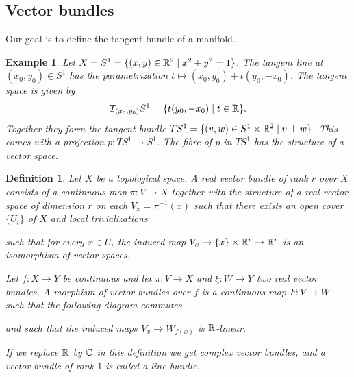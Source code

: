 \documentclass[A4paper, british]{amsart}
\theoremstyle{darkgreentheorem}
\theoremstyle{darkbluedefinition}
\newtheorem{defn}[thm]{Definition}
\theoremstyle{darkredexample}
\newtheorem{exa}[thm]{Example}
\theoremstyle{remark}
\newcommand{\1}{\mathbbm{1}}
\begin{document}
\subsection{Vector bundles}

Our goal is to define the tangent bundle of a manifold.

\begin{exa}
    Let $X=S^{1}=\{(x,y)\in \mathbb{R}^{2}\mid x^{2}+y^{2}=1\}$.
    The tangent line at $(x_{0},y_{0})\in S^{1}$ has the parametrization $t\mapsto (x_{0},y_{0})+t(y_{0},-x_{0})$.
    The tangent space is given by
    \[ T_{(x_{0},y_{0})}S^{1}=\{ t(y_{0},-x_{0})\mid t\in \mathbb{R}\}.\]
    Together they form the tangent bundle $TS^{1}=\{(v,w)\in S^{1}\times \mathbb{R}^{2}\mid v\perp w\}$.
    This comes with a projection $p\colon TS^{1}\to S^{1}$.
    The fibre of $p$ in $TS^{1}$ has the structure of a vector space.
\end{exa}

\begin{defn}
    Let $X$ be a topological space.
    A \textit{real vector bundle} of rank $r$ over $X$ consists of a continuous map $\pi\colon V\to X$ together with the structure of a real vector space of dimension $r$ on each $V_{x}=\pi^{-1}(x)$ such that there exists an open cover $\{U_{i}\}$ of $X$ and local trivializations
    \begin{center}
    \end{center}
    such that for every $x\in U_{i}$ the induced map $V_{x}\to \{x\}\times \mathbb{R}^{r}\to \mathbb{R}^{r}$ is an isomorphism of vector spaces.

    Let $f\colon X\to Y$ be continuous and let $\pi\colon V\to X$ and $\xi\colon W\to Y$ two real vector bundles.
    A morphism of vector bundles over $f$ is a continuous map $F\colon V\to W$ such that the following diagram commutes
    \begin{center}
    \end{center}
    and such that the induced maps $V_{x}\to W_{f(x)}$ is $\mathbb{R}$-linear.
    
    If we replace $\mathbb{R}$ by $\mathbb{C}$ in this definition we get \textit{complex vector bundles}, and a vector bundle of rank $1$ is called a \textit{line bundle}.
\end{defn}
\end{document}

